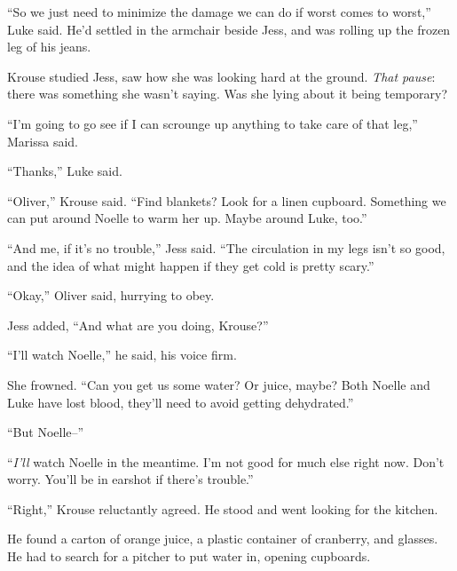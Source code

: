 ``So we just need to minimize the damage we can do if worst comes to worst,'' Luke said.  He'd settled in the armchair beside Jess, and was rolling up the frozen leg of his jeans.



Krouse studied Jess, saw how she was looking hard at the ground.  \emph{That pause}: there was something she wasn't saying.  Was she lying about it being temporary?



``I'm going to go see if I can scrounge up anything to take care of that leg,'' Marissa said.



``Thanks,'' Luke said.



``Oliver,'' Krouse said.  ``Find blankets?  Look for a linen cupboard.  Something we can put around Noelle to warm her up.  Maybe around Luke, too.''



``And me, if it's no trouble,'' Jess said.  ``The circulation in my legs isn't so good, and the idea of what might happen if they get cold is pretty scary.''



``Okay,'' Oliver said, hurrying to obey.



Jess added, ``And what are you doing, Krouse?''



``I'll watch Noelle,'' he said, his voice firm.



She frowned.  ``Can you get us some water?  Or juice, maybe?  Both Noelle and Luke have lost blood, they'll need to avoid getting dehydrated.''



``But Noelle--''



``\emph{I'll} watch Noelle in the meantime.  I'm not good for much else right now.  Don't worry.  You'll be in earshot if there's trouble.''



``Right,''  Krouse reluctantly agreed.  He stood and went looking for the kitchen.



He found a carton of orange juice, a plastic container of cranberry, and glasses.  He had to search for a pitcher to put water in, opening cupboards.



